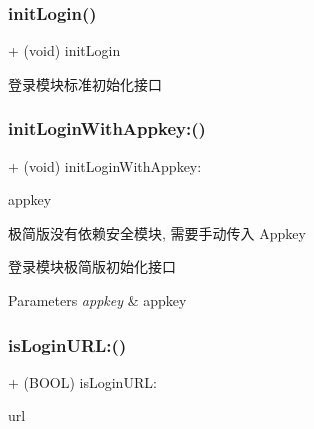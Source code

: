 \subsubsection{\texorpdfstring{init\+Login()}{initLogin()}}
{\footnotesize\ttfamily + (void) init\+Login \begin{DoxyParamCaption}{ }\end{DoxyParamCaption}}

登录模块标准初始化接口 \mbox{\label{interface_alibc_login_bridge_aee215752ac12eb2b672d090698a5b793}} 
\subsubsection{\texorpdfstring{init\+Login\+With\+Appkey\+:()}{initLoginWithAppkey:()}}
{\footnotesize\ttfamily + (void) init\+Login\+With\+Appkey\+: \begin{DoxyParamCaption}\item[{(N\+S\+String $\ast$)}]{appkey }\end{DoxyParamCaption}}



极简版没有依赖安全模块, 需要手动传入 Appkey 

登录模块极简版初始化接口


\begin{DoxyParams}{Parameters}
{\em appkey} & appkey \\
\hline
\end{DoxyParams}
\mbox{\label{interface_alibc_login_bridge_afb088a201b416ba86541dfe2f9c6e9da}} 
\subsubsection{\texorpdfstring{is\+Login\+U\+R\+L\+:()}{isLoginURL:()}}
{\footnotesize\ttfamily + (B\+O\+OL) is\+Login\+U\+R\+L\+: \begin{DoxyParamCaption}\item[{(N\+S\+String $\ast$)}]{url }\end{DoxyParamCaption}}

